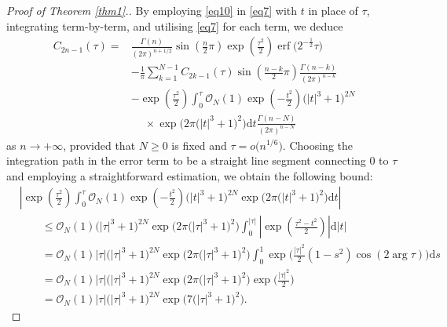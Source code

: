 \documentclass[pdftex]{sigma}
\def\d{\mathrm{d}}
\def\erf{\operatorname{erf}}
\numberwithin{equation}{section}
\begin{document}
\begin{proof}[Proof of Theorem \ref{thm1}.] By employing \eqref{eq10} in \eqref{eq7} with $t$ in place of $\tau$, integrating term-by-term, and utilising \eqref{eq7} for each term, we deduce
\begin{align*}
C_{2n - 1} (\tau ) ={}& \frac{\Gamma (n)}{(2\pi )^{n + 1/2} }\sin \left( \frac{n}{2}\pi \right)\exp \left( \frac{\tau ^2}{2} \right)\erf\big( 2^{ - \frac{1}{2}} \tau \big) \\
&- \frac{1}{\pi}\sum_{k = 1}^{N - 1} C_{2k - 1} (\tau )\sin \left( \frac{n - k}{2}\pi \right)\frac{\Gamma (n - k)}{(2\pi )^{n - k} }
\\ & - \exp \left( \frac{\tau ^2}{2} \right)\int_0^\tau \mathcal{O}_N (1)\exp \left( - \frac{t^2}{2} \right)\bigl(\left| t \right|^3 + 1\bigr)^{2N} \\
&\phantom{-}{}\times\exp \big( 2\pi \bigl(\left| t \right|^3 + 1\bigr)^2 \big)\d t \frac{\Gamma (n - N)}{(2\pi )^{n - N}}
\end{align*}
as $n\to+\infty$, provided that $N\ge 0$ is fixed and $\tau = o\big(n^{1/6}\big)$. Choosing the integration path in the error term to be a straight line segment connecting $0$ to $\tau$ and employing a straightforward estimation, we obtain the following bound:
\begin{align*}
& \left| \exp \left( \frac{\tau ^2}{2} \right)\int_0^\tau \mathcal{O}_N (1)\exp \left( - \frac{t^2}{2} \right)\bigl(\left| t \right|^3 + 1\bigr)^{2N} \exp \big( 2\pi \bigl(\left| t \right|^3 + 1\bigr)^2 \big)\d t \right|
\\ &\qquad \le \mathcal{O}_N (1)\bigl(\left| \tau \right|^3 + 1\bigr)^{2N} \exp \big( 2\pi \bigl(\left| \tau \right|^3 + 1\bigr)^2 \big) \int_0^{\left| \tau \right|} \left| \exp \left( \frac{\tau ^2 - t^2}{2} \right) \right|\d\left| t \right|
\\ & \qquad= \mathcal{O}_N (1) \left| \tau \right|\bigl(\left| \tau \right|^3 + 1\bigr)^{2N} \exp \big( 2\pi \bigl(\left| \tau \right|^3 + 1\bigr)^2 \big) \int_0^1 \exp \bigg( \frac{\left| \tau \right|^2}{2}(1 - s^2 )\cos (2\arg \tau ) \bigg)\d s
\\ & \qquad= \mathcal{O}_N (1)\left| \tau \right|\bigl(\left| \tau \right|^3 + 1\bigr)^{2N} \exp \big( 2\pi \bigl(\left| \tau \right|^3 + 1\bigr)^2 \big)\exp \bigg( \frac{\left| \tau \right|^2}{2} \bigg)
\\ & \qquad= \mathcal{O}_N (1)\left| \tau \right|\bigl(\left| \tau \right|^3 + 1\bigr)^{2N} \exp \big( 7\bigl(\left| \tau \right|^3 + 1\bigr)^2 \big).
\end{align*}

\end{proof}
\end{document}
